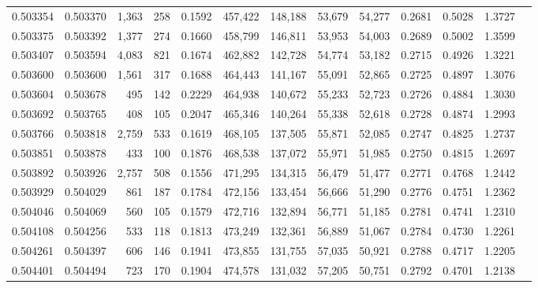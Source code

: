 \begin{tabular}{rrrrrrrrrrrrr}
0.503354 & 0.503370 & 1,363 &   258 &                                     0.1592 & 457,422 & 148,188 &  53,679 &  54,277 & 0.2681 & 0.5028 & 1.3727 \\
0.503375 & 0.503392 & 1,377 &   274 &                                     0.1660 & 458,799 & 146,811 &  53,953 &  54,003 & 0.2689 & 0.5002 & 1.3599 \\
0.503407 & 0.503594 & 4,083 &   821 &                                     0.1674 & 462,882 & 142,728 &  54,774 &  53,182 & 0.2715 & 0.4926 & 1.3221 \\
0.503600 & 0.503600 & 1,561 &   317 &                                     0.1688 & 464,443 & 141,167 &  55,091 &  52,865 & 0.2725 & 0.4897 & 1.3076 \\
0.503604 & 0.503678 &   495 &   142 &                                     0.2229 & 464,938 & 140,672 &  55,233 &  52,723 & 0.2726 & 0.4884 & 1.3030 \\
0.503692 & 0.503765 &   408 &   105 &                                     0.2047 & 465,346 & 140,264 &  55,338 &  52,618 & 0.2728 & 0.4874 & 1.2993 \\
0.503766 & 0.503818 & 2,759 &   533 &                                     0.1619 & 468,105 & 137,505 &  55,871 &  52,085 & 0.2747 & 0.4825 & 1.2737 \\
0.503851 & 0.503878 &   433 &   100 &                                     0.1876 & 468,538 & 137,072 &  55,971 &  51,985 & 0.2750 & 0.4815 & 1.2697 \\
0.503892 & 0.503926 & 2,757 &   508 &                                     0.1556 & 471,295 & 134,315 &  56,479 &  51,477 & 0.2771 & 0.4768 & 1.2442 \\
0.503929 & 0.504029 &   861 &   187 &                                     0.1784 & 472,156 & 133,454 &  56,666 &  51,290 & 0.2776 & 0.4751 & 1.2362 \\
0.504046 & 0.504069 &   560 &   105 &                                     0.1579 & 472,716 & 132,894 &  56,771 &  51,185 & 0.2781 & 0.4741 & 1.2310 \\
0.504108 & 0.504256 &   533 &   118 &                                     0.1813 & 473,249 & 132,361 &  56,889 &  51,067 & 0.2784 & 0.4730 & 1.2261 \\
0.504261 & 0.504397 &   606 &   146 &                                     0.1941 & 473,855 & 131,755 &  57,035 &  50,921 & 0.2788 & 0.4717 & 1.2205 \\
0.504401 & 0.504494 &   723 &   170 &                                     0.1904 & 474,578 & 131,032 &  57,205 &  50,751 & 0.2792 & 0.4701 & 1.2138 \\

\end{tabular}
